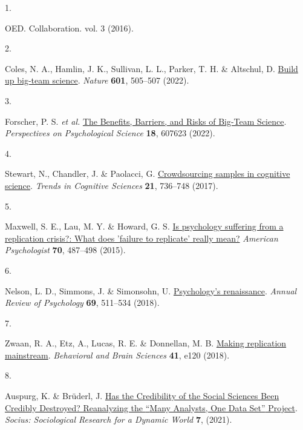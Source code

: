 \documentclass[
  man,floatsintext]{apa6}
\newlength{\cslhangindent}
\newlength{\csllabelwidth}
\newlength{\cslentryspacingunit} %
\newenvironment{CSLReferences}[2] %
 {%
  \setlength{\parindent}{0pt}
  \ifodd #1
  \let\oldpar\par
  \def\par{\hangindent=\cslhangindent\oldpar}
  \fi
  \setlength{\parskip}{#2\cslentryspacingunit}
 }%
 {}
\newcommand{\CSLLeftMargin}[1]{\parbox[t]{\csllabelwidth}{#1}}
\newcommand{\CSLRightInline}[1]{\parbox[t]{\linewidth - \csllabelwidth}{#1}\break}
\begin{document}
\hypertarget{refs}{}
\begin{CSLReferences}{0}{0}
\leavevmode{}%
\CSLLeftMargin{1. }%
\CSLRightInline{OED. Collaboration. vol. 3 (2016).}

\leavevmode{}%
\CSLLeftMargin{2. }%
\CSLRightInline{Coles, N. A., Hamlin, J. K., Sullivan, L. L., Parker, T. H. \& Altschul, D. \href{https://doi.org/10.1038/d41586-022-00150-2}{Build up big-team science}. \emph{Nature} \textbf{601}, 505--507 (2022).}

\leavevmode{}%
\CSLLeftMargin{3. }%
\CSLRightInline{Forscher, P. S. \emph{et al.} \href{https://doi.org/10.1177/17456916221082970}{The Benefits, Barriers, and Risks of Big-Team Science}. \emph{Perspectives on Psychological Science} \textbf{18}, 607623 (2022).}

\leavevmode{}%
\CSLLeftMargin{4. }%
\CSLRightInline{Stewart, N., Chandler, J. \& Paolacci, G. \href{https://doi.org/10.1016/j.tics.2017.06.007}{Crowdsourcing samples in cognitive science}. \emph{Trends in Cognitive Sciences} \textbf{21}, 736--748 (2017).}

\leavevmode{}%
\CSLLeftMargin{5. }%
\CSLRightInline{Maxwell, S. E., Lau, M. Y. \& Howard, G. S. \href{https://doi.org/10.1037/a0039400}{Is psychology suffering from a replication crisis?: What does 'failure to replicate' really mean?} \emph{American Psychologist} \textbf{70}, 487--498 (2015).}

\leavevmode{}%
\CSLLeftMargin{6. }%
\CSLRightInline{Nelson, L. D., Simmons, J. \& Simonsohn, U. \href{https://doi.org/10.1146/annurev-psych-122216-011836}{Psychology's renaissance}. \emph{Annual Review of Psychology} \textbf{69}, 511--534 (2018).}

\leavevmode{}%
\CSLLeftMargin{7. }%
\CSLRightInline{Zwaan, R. A., Etz, A., Lucas, R. E. \& Donnellan, M. B. \href{https://doi.org/10.1017/S0140525X17001972}{Making replication mainstream}. \emph{Behavioral and Brain Sciences} \textbf{41}, e120 (2018).}

\leavevmode{}%
\CSLLeftMargin{8. }%
\CSLRightInline{Auspurg, K. \& Brüderl, J. \href{https://doi.org/10.1177/23780231211024421}{Has the Credibility of the Social Sciences Been Credibly Destroyed? Reanalyzing the {``}Many Analysts, One Data Set{''} Project}. \emph{Socius: Sociological Research for a Dynamic World} \textbf{7}, (2021).}


\end{CSLReferences}
\end{document}
